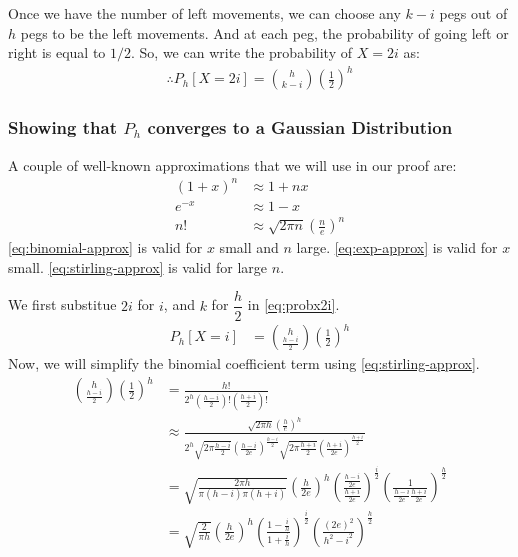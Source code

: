 Once we have the number of left movements, we can choose any $k-i$ pegs out of $h$ pegs to be the left movements.
And at each peg, the probability of going left or right is equal to $1/2$.
So, we can write the probability of $X=2i$ as:
\begin{align}
	\therefore P_h[X=2i] = \binom{h}{k-i} \left(\frac{1}{2}\right)^h \label{eq:probx2i}
\end{align}

\subsubsection*{Showing that $P_h$ converges to a Gaussian Distribution}
\begin{remark}
	A couple of well-known approximations that we will use in our proof are:
	\begin{align}
		(1+x)^n & \approx 1 + nx \label{eq:binomial-approx}                                   \\
		e^{-x}  & \approx 1 - x \label{eq:exp-approx}                                         \\
		n!      & \approx \sqrt{2\pi n} \left(\frac{n}{e}\right)^n \label{eq:stirling-approx}
	\end{align}
	\cref{eq:binomial-approx} is valid for $x$ small and $n$ large.
	\cref{eq:exp-approx} is valid for $x$ small.
	\cref{eq:stirling-approx} is valid for large $n$.
\end{remark}
We first substitue $2i$ for $i$, and $k$ for $\dfrac{h}{2}$ in \cref{eq:probx2i}.
\begin{align*}
	P_h[X=i] & = \binom{h}{\frac{h-i}{2}} \left(\frac{1}{2}\right)^h
\end{align*}
Now, we will simplify the binomial coefficient term using \cref{eq:stirling-approx}.
\begin{align*}
	\binom{h}{\frac{h-i}{2}}\left(\frac{1}{2}\right)^h & = \frac{h!}{2^h\left(\frac{h-i}{2}\right)!\left(\frac{h+i}{2}\right)!}                                                                                                                              \\
	                                                   & \approx \frac{\sqrt{2\pi h}\left(\frac{h}{e}\right)^h}{2^h\sqrt{2\pi \frac{h-i}{2}}\left(\frac{h-i}{2e}\right)^\frac{h-i}{2}\sqrt{2\pi \frac{h+i}{2}}\left(\frac{h+i}{2e}\right)^\frac{h+i}{2}}     \\
	                                                   & = \sqrt{\frac{2\pi h}{\pi(h-i)\pi(h+i)} }\left(\frac{h}{2e}\right)^h \left(\frac{\frac{h-i}{2e}}{\frac{h+i}{2e}}\right)^\frac{i}{2}\left(\frac{1}{\frac{h-i}{2e} \frac{h+i}{2e}}\right)^\frac{h}{2} \\
	                                                   & = \sqrt{\frac{2}{\pi h}}\left(\frac{h}{2e}\right)^h \left(\frac{1-\frac{i}{h}}{1+\frac{i}{h}}\right)^\frac{i}{2}\left(\frac{(2e)^2}{h^2-i^2}\right)^\frac{h}{2}                                     \\
\end{align*}
